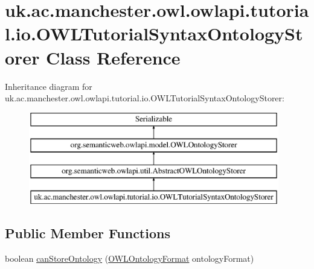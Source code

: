 \hypertarget{classuk_1_1ac_1_1manchester_1_1owl_1_1owlapi_1_1tutorial_1_1io_1_1_o_w_l_tutorial_syntax_ontology_storer}{\section{uk.\-ac.\-manchester.\-owl.\-owlapi.\-tutorial.\-io.\-O\-W\-L\-Tutorial\-Syntax\-Ontology\-Storer Class Reference}
\label{classuk_1_1ac_1_1manchester_1_1owl_1_1owlapi_1_1tutorial_1_1io_1_1_o_w_l_tutorial_syntax_ontology_storer}
}
Inheritance diagram for uk.\-ac.\-manchester.\-owl.\-owlapi.\-tutorial.\-io.\-O\-W\-L\-Tutorial\-Syntax\-Ontology\-Storer\-:\begin{figure}[H]
\begin{center}
\leavevmode
\includegraphics[height=4.000000cm]{classuk_1_1ac_1_1manchester_1_1owl_1_1owlapi_1_1tutorial_1_1io_1_1_o_w_l_tutorial_syntax_ontology_storer}
\end{center}
\end{figure}
\subsection*{Public Member Functions}
\begin{DoxyCompactItemize}
\item 
boolean \hyperlink{classuk_1_1ac_1_1manchester_1_1owl_1_1owlapi_1_1tutorial_1_1io_1_1_o_w_l_tutorial_syntax_ontology_storer_ad82f71affc96438419230734589ccb17}{can\-Store\-Ontology} (\hyperlink{classorg_1_1semanticweb_1_1owlapi_1_1model_1_1_o_w_l_ontology_format}{O\-W\-L\-Ontology\-Format} ontology\-Format)
\end{DoxyCompactItemize}
